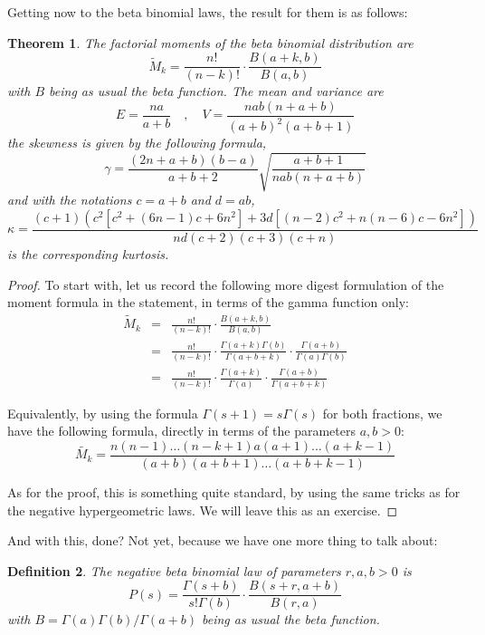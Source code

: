 \documentclass[12pt]{amsbook}
\newtheorem{theorem}{Theorem}[chapter]
\newtheorem{definition}[theorem]{Definition}
\begin{document}
Getting now to the beta binomial laws, the result for them is as follows:


\begin{theorem}
The factorial moments of the beta binomial distribution are
$$\widetilde{M}_k=\frac{n!}{(n-k)!}\cdot\frac{B(a+k,b)}{B(a,b)}$$
with $B$ being as usual the beta function. The mean and variance are
$$E=\frac{na}{a+b}\quad,\quad V=\frac{nab(n+a+b)}{(a+b)^2(a+b+1)}$$
the skewness is given by the following formula,
$$\gamma=\frac{(2n+a+b)(b-a)}{a+b+2}\sqrt{\frac{a+b+1}{nab(n+a+b)}}$$
and with the notations $c=a+b$ and $d=ab$, 
$$\kappa=\frac{(c+1)(c^2[c^2+(6n-1)c+6n^2]+3d[(n-2)c^2+n(n-6)c-6n^2])}{nd(c+2)(c+3)(c+n)}$$
is the corresponding kurtosis.
\end{theorem}

\begin{proof}
To start with, let us record the following more digest formulation of the moment formula in the statement, in terms of the gamma function only:
\begin{eqnarray*}
\widetilde{M}_k
&=&\frac{n!}{(n-k)!}\cdot\frac{B(a+k,b)}{B(a,b)}\\
&=&\frac{n!}{(n-k)!}\cdot\frac{\Gamma(a+k)\Gamma(b)}{\Gamma(a+b+k)}\cdot\frac{\Gamma(a+b)}{\Gamma(a)\Gamma(b)}\\
&=&\frac{n!}{(n-k)!}\cdot\frac{\Gamma(a+k)}{\Gamma(a)}\cdot\frac{\Gamma(a+b)}{\Gamma(a+b+k)}
\end{eqnarray*}

Equivalently, by using the formula $\Gamma(s+1)=s\Gamma(s)$ for both fractions, we have the following formula, directly in terms of the parameters $a,b>0$:
$$\widetilde{M_k}=\frac{n(n-1)\ldots(n-k+1)a(a+1)\ldots(a+k-1)}{(a+b)(a+b+1)\ldots(a+b+k-1)}$$

As for the proof, this is something quite standard, by using the same tricks as for the negative hypergeometric laws. We will leave this as an exercise.
\end{proof}

And with this, done? Not yet, because we have one more thing to talk about:


\begin{definition}
The negative beta binomial law of parameters $r,a,b>0$ is
$$P(s)=\frac{\Gamma(s+b)}{s!\Gamma(b)}\cdot\frac{B(s+r,a+b)}{B(r,a)}$$
with $B=\Gamma(a)\Gamma(b)/\Gamma(a+b)$ being as usual the beta function.
\end{definition}
\end{document}
